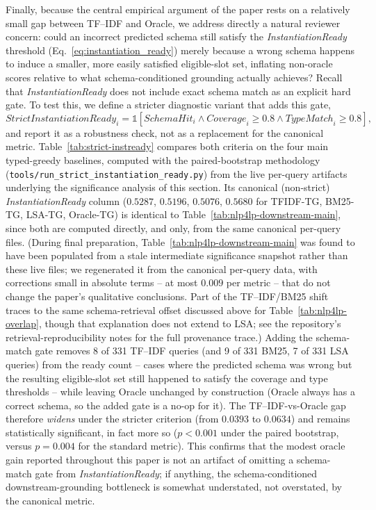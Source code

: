\documentclass[pdflatex,sn-basic,Numbered]{sn-jnl}
\begin{document}
Finally, because the central empirical argument of the paper rests on a relatively small gap between TF--IDF and Oracle, we address directly a natural reviewer concern: could an incorrect predicted schema still satisfy the \textit{InstantiationReady} threshold (Eq.~\eqref{eq:instantiation_ready}) merely because a wrong schema happens to induce a smaller, more easily satisfied eligible-slot set, inflating non-oracle scores relative to what schema-conditioned grounding actually achieves? Recall that \textit{InstantiationReady} does not include exact schema match as an explicit hard gate. To test this, we define a stricter diagnostic variant that adds this gate,
\begin{equation}
\mathit{StrictInstantiationReady}_i = \mathbb{1}\!\left[\mathit{SchemaHit}_i \wedge \mathit{Coverage}_i \geq 0.8 \wedge \mathit{TypeMatch}_i \geq 0.8\right],
\label{eq:strict_instantiation_ready}
\end{equation}
and report it as a robustness check, not as a replacement for the canonical metric. Table~\ref{tab:strict-instready} compares both criteria on the four main typed-greedy baselines, computed with the paired-bootstrap methodology (\texttt{tools/run\_strict\_instantiation\_ready.py}) from the live per-query artifacts underlying the significance analysis of this section. Its canonical (non-strict) \textit{InstantiationReady} column ($0.5287$, $0.5196$, $0.5076$, $0.5680$ for TFIDF-TG, BM25-TG, LSA-TG, Oracle-TG) is identical to Table~\ref{tab:nlp4lp-downstream-main}, since both are computed directly, and only, from the same canonical per-query files. (During final preparation, Table~\ref{tab:nlp4lp-downstream-main} was found to have been populated from a stale intermediate significance snapshot rather than these live files; we regenerated it from the canonical per-query data, with corrections small in absolute terms -- at most $0.009$ per metric -- that do not change the paper's qualitative conclusions. Part of the TF--IDF/BM25 shift traces to the same schema-retrieval offset discussed above for Table~\ref{tab:nlp4lp-overlap}, though that explanation does not extend to LSA; see the repository's retrieval-reproducibility notes for the full provenance trace.) Adding the schema-match gate removes 8 of 331 TF--IDF queries (and 9 of 331 BM25, 7 of 331 LSA queries) from the ready count -- cases where the predicted schema was wrong but the resulting eligible-slot set still happened to satisfy the coverage and type thresholds -- while leaving Oracle unchanged by construction (Oracle always has a correct schema, so the added gate is a no-op for it). The TF--IDF-vs-Oracle gap therefore \emph{widens} under the stricter criterion (from $0.0393$ to $0.0634$) and remains statistically significant, in fact more so ($p<0.001$ under the paired bootstrap, versus $p=0.004$ for the standard metric). This confirms that the modest oracle gain reported throughout this paper is not an artifact of omitting a schema-match gate from \textit{InstantiationReady}; if anything, the schema-conditioned downstream-grounding bottleneck is somewhat understated, not overstated, by the canonical metric.
\end{document}
